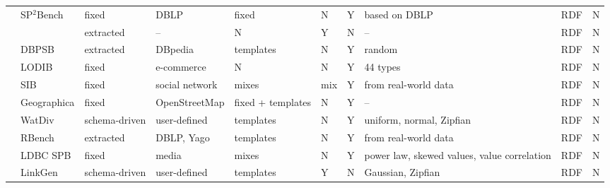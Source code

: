 \begin{sidewaystable}
{\begin{tabular}{| c | p{2.2cm} | p{2cm} |  p{2.2cm} | l |  l | l | p{3cm} | p{1.4cm} | l | }
 & SP$^2$Bench & fixed & DBLP  & fixed & N & Y & based on DBLP  & RDF & N   \\
\cline{2-10}
 & \cite{Duan:2011:AOC:1989323.1989340} & extracted & -- & N & Y &N & -- &  RDF & N    \\
\cline{2-10}
 & DBPSB & extracted & DBpedia &  templates & N & Y & random &  RDF & N   \\
\cline{2-10}
 & LODIB & fixed & e-commerce &  N & N & Y & 44 types &  RDF & N   \\
\cline{2-10}
 & SIB & fixed & social network &  mixes & mix & Y & from real-world data &  RDF & N   \\
\cline{2-10}
 & Geographica & fixed & OpenStreetMap  & fixed + templates  & N & Y & -- &  RDF & N   \\
\cline{2-10}
 & WatDiv & schema-driven & user-defined  & templates & N & Y & uniform, normal, Zipfian &  RDF & N   \\
\cline{2-10}
 & RBench & extracted & DBLP, Yago  & templates & N & Y & from real-world data &  RDF & N  \\
\cline{2-10}
 & LDBC SPB & fixed & media  & mixes & N & Y & power law, skewed values, value correlation &  RDF & N  \\
\cline{2-10}
 & LinkGen & schema-driven & user-defined & templates & Y  & N & Gaussian, Zipfian& RDF & N\\
\hline
\end{tabular} }
\label{tab:comparisonCharacteristicsA}
\end{sidewaystable}


